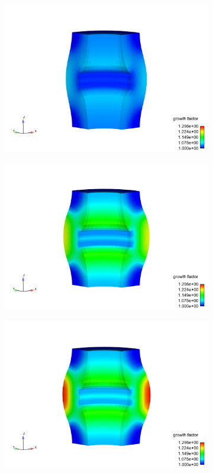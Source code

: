 \documentclass[12pt]{article}
\begin{document}
\begin{figure}[H]
	\centering
	\begin{subfigure}
		\centering
		\includegraphics[height=0.25\textheight]{./figs/step1.jpg}
		\label{fig:step1}
	\end{subfigure}
	\begin{subfigure}
		\centering
		\includegraphics[height=0.25\textheight]{./figs/step5.jpg}
		\label{fig:step5}
	\end{subfigure}
	\begin{subfigure}
		\centering
		\includegraphics[height=0.25\textheight]{./figs/step15.jpg}

\end{subfigure}
\end{figure}
\end{document}
